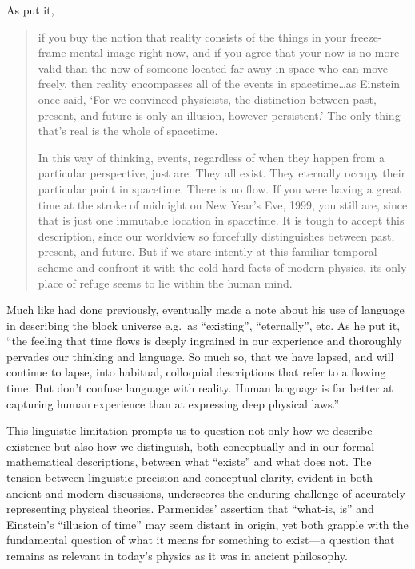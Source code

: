 \documentclass[aps,rmp,groupedaddress,twocolumn,10pt]{revtex4-2}
\begin{document}
As \citet{Greene2004} put it, 
\begin{quote}
    if you buy the notion that reality consists of the things in your freeze-frame mental image right now, and if you agree that your now is no more valid than the now of someone located far away in space who can move freely, then reality encompasses all of the events in spacetime\ldots as Einstein once said, `For we convinced physicists, the distinction between past, present, and future is only an illusion, however persistent.' The only thing that's real is the whole of spacetime.

    In this way of thinking, events, regardless of when they happen from a particular perspective, just are. They all exist. They eternally occupy their particular point in spacetime. There is no flow. If you were having a great time at the stroke of midnight on New Year's Eve, 1999, you still are, since that is just one immutable location in spacetime. It is tough to accept this description, since our worldview so forcefully distinguishes between past, present, and future. But if we stare intently at this familiar temporal scheme and confront it with the cold hard facts of modern physics, its only place of refuge seems to lie within the human mind.
\end{quote}

Much like \citet{Einstein1938} had done previously, \citet{Greene2004} eventually made a note about his use of language in describing the block universe e.g.\ as ``existing'', ``eternally'', etc. As he put it, ``the feeling that time flows is deeply ingrained in our experience and thoroughly pervades our thinking and language. So much so, that we have lapsed, and will continue to lapse, into habitual, colloquial descriptions that refer to a flowing time. But don't confuse language with reality. Human language is far better at capturing human experience than at expressing deep physical laws.''

This linguistic limitation prompts us to question not only how we describe existence but also how we distinguish, both conceptually and in our formal mathematical descriptions, between what ``exists'' and what does not. The tension between linguistic precision and conceptual clarity, evident in both ancient and modern discussions, underscores the enduring challenge of accurately representing physical theories. Parmenides' assertion that ``what-is, is'' and Einstein's ``illusion of time'' may seem distant in origin, yet both grapple with the fundamental question of what it means for something to exist---a question that remains as relevant in today's physics as it was in ancient philosophy.
\end{document}
